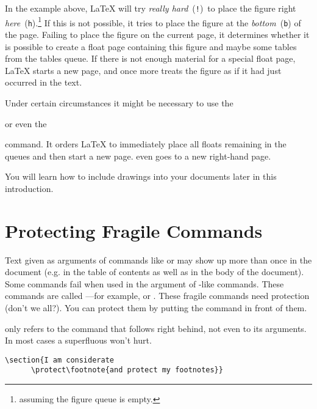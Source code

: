 \noindent In the example above, 
\LaTeX{} will try \emph{really hard}~(\texttt{!})\ to place the figure
right \emph{here}~(\texttt{h}).\footnote{assuming the figure queue is
  empty.} If this is not possible, it tries to place the figure at the
\emph{bottom}~(\texttt{b}) of the page.  Failing to place the figure
on the current page, it determines whether it is possible to create a float
page containing this figure and maybe some tables from the tables
queue. If there is not enough material for a special float page,
\LaTeX{} starts a new page, and once more treats the figure as if it
had just occurred in the text.

Under certain circumstances it might be necessary to use the 

\begin{lscommand}
 or even the  
\end{lscommand}

\noindent command. It orders \LaTeX{} to immediately place all 
floats remaining in the queues and then start a new
page.  even goes to a new right-hand page.

You will learn how to include \PSi{}
drawings into your \LaTeXe{} documents later in this introduction.

\section{Protecting Fragile Commands}

Text given as arguments of commands like  or  may
show up more than once in the document (e.g. in the table of contents as
well as in the body of the document). Some commands fail when used in the
argument of -like commands. These commands are called 
---for example,  or . These
fragile commands need protection (don't we all?). You can
protect them by putting the  command in front of them.

 only refers to the command that follows right behind, not even
to its arguments. In most cases a superfluous  won't hurt.

\begin{code}
\verb|\section{I am considerate|\\
\verb|      \protect\footnote{and protect my footnotes}}|
\end{code}

